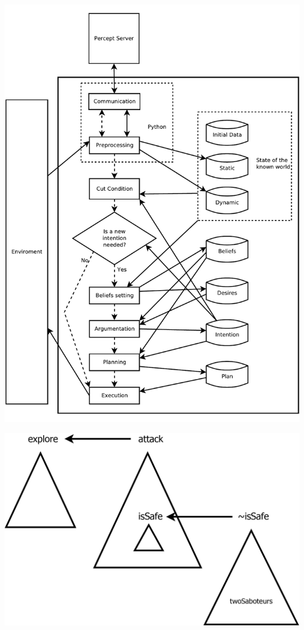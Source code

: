 \documentclass[pdf,xcolor=svgnames]{beamer}
\begin{document}

\begin{frame}
\center
 \includegraphics[height=\textheight]{agent_architecture.pdf}

\end{frame}


\begin{frame}
\center
 \includegraphics[width=\textwidth]{mamarracho.png}

\end{frame}
\end{document}
